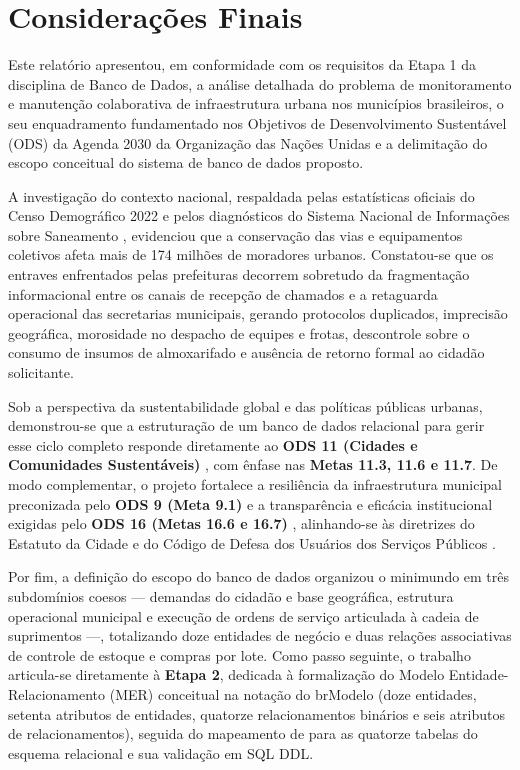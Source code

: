 \chapter{Considerações Finais}
\label{cap:consideracoes}

Este relatório apresentou, em conformidade com os requisitos da Etapa 1 da disciplina de Banco de Dados, a análise detalhada do problema de monitoramento e manutenção colaborativa de infraestrutura urbana nos municípios brasileiros, o seu enquadramento fundamentado nos Objetivos de Desenvolvimento Sustentável (ODS) da Agenda 2030 da Organização das Nações Unidas e a delimitação do escopo conceitual do sistema de banco de dados proposto.

A investigação do contexto nacional, respaldada pelas estatísticas oficiais do Censo Demográfico 2022 \cite{ibge2024censo2022malha, ibge2025entorno} e pelos diagnósticos do Sistema Nacional de Informações sobre Saneamento \cite{snis2023drenagem, snis2023residuos}, evidenciou que a conservação das vias e equipamentos coletivos afeta mais de 174 milhões de moradores urbanos. Constatou-se que os entraves enfrentados pelas prefeituras decorrem sobretudo da fragmentação informacional entre os canais de recepção de chamados e a retaguarda operacional das secretarias municipais, gerando protocolos duplicados, imprecisão geográfica, morosidade no despacho de equipes e frotas, descontrole sobre o consumo de insumos de almoxarifado e ausência de retorno formal ao cidadão solicitante.

Sob a perspectiva da sustentabilidade global e das políticas públicas urbanas, demonstrou-se que a estruturação de um banco de dados relacional para gerir esse ciclo completo responde diretamente ao \textbf{ODS 11 (Cidades e Comunidades Sustentáveis)} \cite{onubrasil2015ods11, ipea2019ods11}, com ênfase nas \textbf{Metas 11.3, 11.6 e 11.7}. De modo complementar, o projeto fortalece a resiliência da infraestrutura municipal preconizada pelo \textbf{ODS 9 (Meta 9.1)} \cite{onubrasil2015ods9} e a transparência e eficácia institucional exigidas pelo \textbf{ODS 16 (Metas 16.6 e 16.7)} \cite{onubrasil2015ods16}, alinhando-se às diretrizes do Estatuto da Cidade \cite{brasil2001estatutocidade} e do Código de Defesa dos Usuários dos Serviços Públicos \cite{brasil2017lei13460}.

Por fim, a definição do escopo do banco de dados organizou o minimundo em três subdomínios coesos --- demandas do cidadão e base geográfica, estrutura operacional municipal e execução de ordens de serviço articulada à cadeia de suprimentos ---, totalizando doze entidades de negócio e duas relações associativas de controle de estoque e compras por lote. Como passo seguinte, o trabalho articula-se diretamente à \textbf{Etapa 2}, dedicada à formalização do Modelo Entidade-Relacionamento (MER) conceitual na notação do brModelo (doze entidades, setenta atributos de entidades, quatorze relacionamentos binários e seis atributos de relacionamentos), seguida do mapeamento de  para as quatorze tabelas do esquema relacional e sua validação em SQL DDL.

